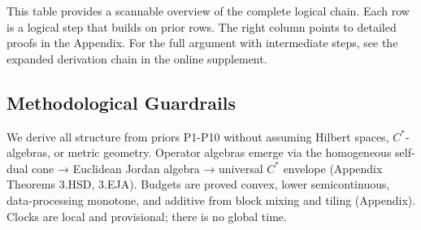 \begin{remark}
This table provides a scannable overview of the complete logical chain. Each row is a logical step that builds on prior rows. The right column points to detailed proofs in the Appendix. For the full argument with intermediate steps, see the expanded derivation chain in the online supplement.
\end{remark}

\subsection{Methodological Guardrails}
\label{subsec:guardrails}

We derive all structure from priors P1-P10 without assuming Hilbert spaces, $C^*$-algebras, or metric geometry. Operator algebras emerge via the homogeneous self-dual cone → Euclidean Jordan algebra → universal $C^*$ envelope (Appendix Theorems 3.HSD, 3.EJA). Budgets are proved convex, lower semicontinuous, data-processing monotone, and additive from block mixing and tiling (Appendix). Clocks are local and provisional; there is no global time.